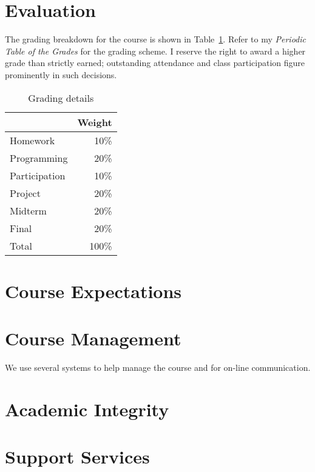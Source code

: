 \documentclass[11pt]{article}
\begin{document}
\section{Evaluation}

The grading breakdown for the course
is shown in Table~\ref{tab:grading}.
Refer to my \emph{Periodic Table of the Grades}
for the grading scheme.
I reserve the right to award a higher grade than strictly earned;
outstanding attendance and class participation
figure prominently in such decisions.

\begin{table}[htb]
  \centering
  \begin{tabular}{lr}
    \toprule
    & Weight \\
    \midrule
    Homework      & 10\%   \\
    Programming   & 20\%   \\
    Participation & 10\%   \\
    Project       & 20\%   \\
    Midterm       & 20\%   \\
    Final         & 20\%   \\
    \midrule
    Total         & 100\%  \\
    \bottomrule
  \end{tabular}
  \caption{Grading details}
  \label{tab:grading}
\end{table}
\begin{comment}
#+ORGTBL: SEND grades orgtbl-to-latex :splice nil :skip 0 :booktabs t
|               | Weight |
|               |    <r> |
|---------------+--------|
| Homework      |    10%
| Programming   |    20%
| Participation |    10%
| Project       |    20%
| Midterm       |    20%
| Final         |    20%
|---------------+--------|
| Total         |   100%
#+TBLFM: @11$2=100*vsum(@I..II);%
\end{comment}

\section{Course Expectations}



\section{Course Management}

We use several systems to help manage the course
and for on-line communication.





\section{Academic Integrity}



\section{Support Services}



\printbibliography{}

\lastupdated
\end{document}
